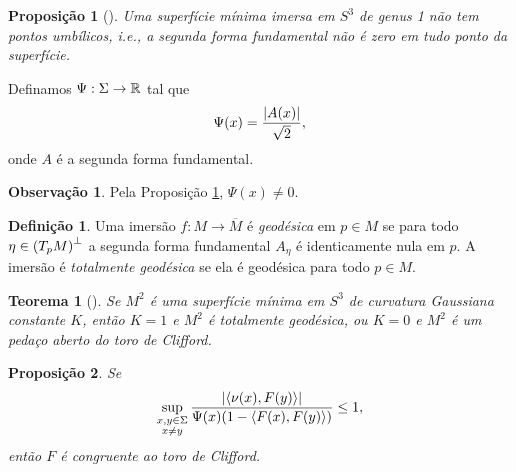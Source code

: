 \documentclass[12pt,a4paper]{beamer}
\newtheorem{teorema}{Teorema}
\newtheorem{proposicao}{Proposição}
\theoremstyle{definition}
\newtheorem{definicao}{Definição}
\newtheorem{observacao}{Observação}
\begin{document}
\begin{frame}
	\begin{proposicao}[\cite{Brendle2013}]
		\label{sup-min-nao-tem-pontos-umbilicos}
		Uma superfície mínima imersa em $S^3$ de genus 1 não tem pontos umbílicos, i.e., a segunda forma fundamental não é zero em tudo ponto da superfície.
	\end{proposicao}
\end{frame}


\begin{frame}

	Definamos $\Psi: \Sigma \rightarrow \mathbb R$ tal que
	\begin{equation*}
	\Psi(x) = \frac{\left| A(x) \right|}{\sqrt{2}},
	\end{equation*}
	onde $A$ é a segunda forma fundamental.

	\begin{observacao}
		Pela Proposição \ref{sup-min-nao-tem-pontos-umbilicos}, $\Psi(x) \neq 0$.
	\end{observacao}

\end{frame}

\begin{frame}
	\begin{definicao}
		Uma imersão $f: M \rightarrow \overline{M}$ é \emph{geodésica} em $p \in M$ se para todo $\eta \in \left( T_p M \right)^\perp$ a segunda forma fundamental $A_\eta$ é identicamente nula em $p$. A imersão é \emph{totalmente geodésica} se ela é geodésica para todo $p \in M$.
	\end{definicao}
\end{frame}


\begin{frame}
	
	
	\begin{teorema}[\cite{Lawson1969}]
		\label{curv-gauss-de-sup-min-em-S3}
		Se $M^2$ é uma superfície mínima em $S^3$ de curvatura Gaussiana constante $K$, então $K=1$ e $M^2$ é totalmente geodésica, ou $K=0$ e $M^2$ é um pedaço aberto do toro de Clifford.
	\end{teorema}	
	
\end{frame}

\begin{frame}
	\begin{proposicao}\label{aleph-leq-1}
		Se
		\begin{equation*}
			\sup_{\substack{x,y \in \Sigma \\ x \neq y}} \frac{\left| \left\langle \nu(x),F(y) \right\rangle \right|}{\Psi(x) (1-\left\langle F(x),F(y) \right\rangle)} \leq 1,
		\end{equation*}
		então $F$ é congruente ao toro de Clifford.
	\end{proposicao}
\end{frame}
\end{document}
